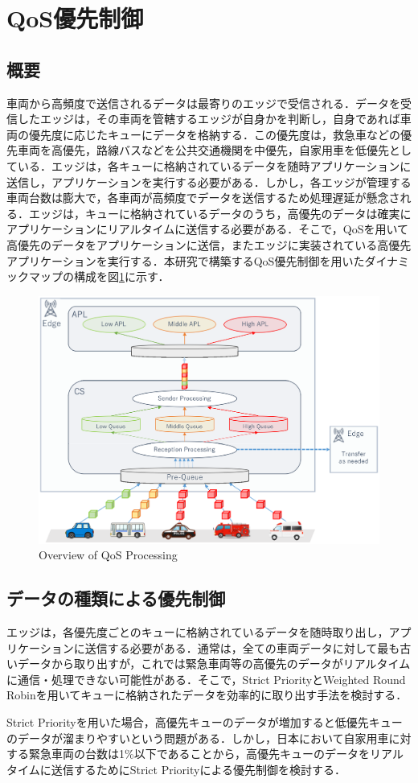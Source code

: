 \documentclass[a4paper,10pt,twocolumn,uplatex]{jsarticle}
\begin{document}
\section{QoS優先制御}
\subsection{概要}
車両から高頻度で送信されるデータは最寄りのエッジで受信される．データを受信したエッジは，その車両を管轄するエッジが自身かを判断し，自身であれば車両の優先度に応じたキューにデータを格納する．この優先度は，救急車などの優先車両を高優先，路線バスなどを公共交通機関を中優先，自家用車を低優先としている．エッジは，各キューに格納されているデータを随時アプリケーションに送信し，アプリケーションを実行する必要がある．しかし，各エッジが管理する車両台数は膨大で，各車両が高頻度でデータを送信するため処理遅延が懸念される．エッジは，キューに格納されているデータのうち，高優先のデータは確実にアプリケーションにリアルタイムに送信する必要がある．そこで，QoSを用いて高優先のデータをアプリケーションに送信，またエッジに実装されている高優先アプリケーションを実行する．本研究で構築するQoS優先制御を用いたダイナミックマップの構成を図\ref{fig:qos-overview}に示す．

\begin{figure}[!t]
\centering%
\includegraphics[width=0.7\linewidth]{img/QoSoverview.eps}
\caption{Overview of QoS Processing}
\label{fig:qos-overview}
\end{figure}

\subsection{データの種類による優先制御}
\label{sec:data-priority}
エッジは，各優先度ごとのキューに格納されているデータを随時取り出し，アプリケーションに送信する必要がある．通常は，全ての車両データに対して最も古いデータから取り出すが，これでは緊急車両等の高優先のデータがリアルタイムに通信・処理できない可能性がある．そこで，Strict PriorityとWeighted Round Robinを用いてキューに格納されたデータを効率的に取り出す手法を検討する．\par
Strict Priorityを用いた場合，高優先キューのデータが増加すると低優先キューのデータが溜まりやすいという問題がある．しかし，日本において自家用車に対する緊急車両の台数は1\%以下であることから\cite{EmergencyCars}，高優先キューのデータをリアルタイムに送信するためにStrict Priorityによる優先制御を検討する．
\end{document}
